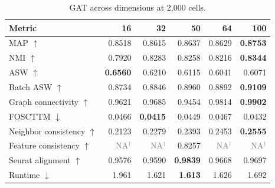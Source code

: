 \documentclass[10pt]{article}
\begin{document}
\begin{table}[H]\centering\scriptsize
\caption{GAT across dimensions at 2,000 cells.}
\begin{tabular}{@{}lrrrrr@{}}\toprule
Metric & 16 & 32 & 50 & 64 & 100 \\\midrule
MAP $\uparrow$ & 0.8518 & 0.8615 & 0.8637 & 0.8629 & \textbf{0.8753} \\
NMI $\uparrow$ & 0.7920 & 0.8283 & 0.8258 & 0.8216 & \textbf{0.8344} \\
ASW $\uparrow$ & \textbf{0.6560} & 0.6210 & 0.6115 & 0.6041 & 0.6071 \\
Batch ASW $\uparrow$ & 0.8734 & 0.8846 & 0.8960 & 0.8892 & \textbf{0.9109} \\
Graph connectivity $\uparrow$ & 0.9621 & 0.9685 & 0.9454 & 0.9814 & \textbf{0.9902} \\
FOSCTTM $\downarrow$ & 0.0466 & \textbf{0.0415} & 0.0449 & 0.0467 & 0.0432 \\
Neighbor consistency $\uparrow$ & 0.2123 & 0.2279 & 0.2393 & 0.2453 & \textbf{0.2555} \\
Feature consistency $\uparrow$ & \textcolor{gray}{NA$^{\dagger}$} & \textcolor{gray}{NA$^{\dagger}$} & 0.8257 & \textcolor{gray}{NA$^{\dagger}$} & \textcolor{gray}{NA$^{\dagger}$} \\
Seurat alignment $\uparrow$ & 0.9576 & 0.9590 & \textbf{0.9839} & 0.9668 & 0.9697 \\
Runtime $\downarrow$ & 1.961 & 1.621 & \textbf{1.613} & 1.626 & 1.692 \\
\bottomrule\end{tabular}\end{table}
\end{document}
